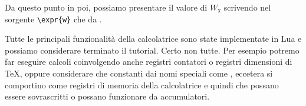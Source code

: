 Da questo punto in poi, possiamo presentare il valore di \( W_\mathrm{x} \)
scrivendo nel sorgente \verb=\expr{w}= che da .

Tutte le principali funzionalità della calcolatrice sono state implementate in
Lua e possiamo considerare terminato il tutorial. Certo non tutte. Per esempio
potremo far eseguire calcoli coinvolgendo anche registri contatori o registri
dimensioni di \TeX{}, oppure considerare che constanti dai nomi speciali come
,  eccetera si comportino come registri di memoria della
calcolatrice e quindi che possano essere sovrascritti o possano funzionare da
accumulatori.





